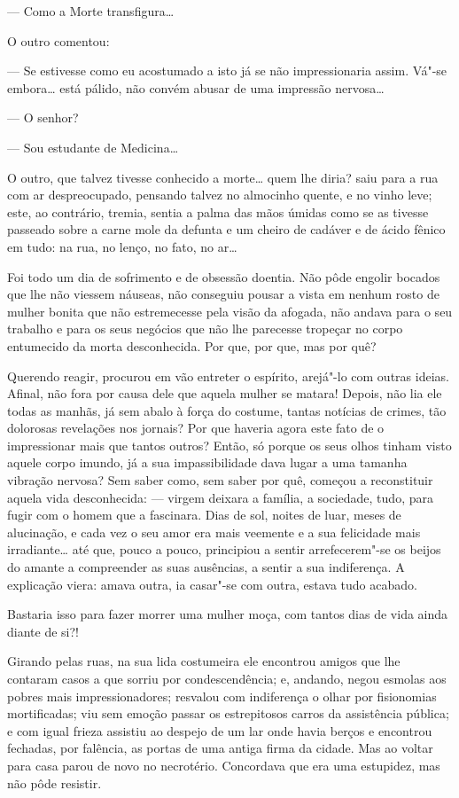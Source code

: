 --- Como a Morte transfigura\ldots{}

O outro comentou:

--- Se estivesse como eu acostumado a isto já se não impressionaria
assim. Vá"-se embora\ldots{} está pálido, não convém abusar de uma impressão
nervosa\ldots{}

--- O senhor?

--- Sou estudante de Medicina\ldots{}

O outro, que talvez tivesse conhecido a morte\ldots{} quem lhe diria? saiu
para a rua com ar despreocupado, pensando talvez no almocinho quente, e
no vinho leve; este, ao contrário, tremia, sentia a palma das mãos
úmidas como se as tivesse passeado sobre a carne mole da defunta e um
cheiro de cadáver e de ácido fênico em tudo: na rua, no lenço, no fato,
no ar\ldots{}

Foi todo um dia de sofrimento e de obsessão doentia. Não pôde engolir
bocados que lhe não viessem náuseas, não conseguiu pousar a vista em
nenhum rosto de mulher bonita que não estremecesse pela visão da
afogada, não andava para o seu trabalho e para os seus negócios que não
lhe parecesse tropeçar no corpo entumecido da morta desconhecida. Por
que, por que, mas por quê?

Querendo reagir, procurou em vão entreter o espírito, arejá"-lo com
outras ideias. Afinal, não fora por causa dele que aquela mulher se
matara! Depois, não lia ele todas as manhãs, já sem abalo à força do
costume, tantas notícias de crimes, tão dolorosas revelações nos
jornais? Por que haveria agora este fato de o impressionar mais que
tantos outros? Então, só porque os seus olhos tinham visto aquele corpo
imundo, já a sua impassibilidade dava lugar a uma tamanha vibração
nervosa? Sem saber como, sem saber por quê, começou a reconstituir
aquela vida desconhecida: --- virgem deixara a família, a sociedade,
tudo, para fugir com o homem que a fascinara. Dias de sol, noites de
luar, meses de alucinação, e cada vez o seu amor era mais veemente e a
sua felicidade mais irradiante\ldots{} até que, pouco a pouco, principiou a
sentir arrefecerem"-se os beijos do amante a compreender as suas
ausências, a sentir a sua indiferença. A explicação viera: amava outra,
ia casar"-se com outra, estava tudo acabado.

Bastaria isso para fazer morrer uma mulher moça, com tantos dias de vida
ainda diante de si?!

Girando pelas ruas, na sua lida costumeira ele encontrou amigos que lhe
contaram casos a que sorriu por condescendência; e, andando, negou
esmolas aos pobres mais impressionadores; resvalou com indiferença o
olhar por fisionomias mortificadas; viu sem emoção passar os
estrepitosos carros da assistência pública; e com igual frieza assistiu
ao despejo de um lar onde havia berços e encontrou fechadas, por
falência, as portas de uma antiga firma da cidade. Mas ao voltar para
casa parou de novo no necrotério. Concordava que era uma estupidez, mas
não pôde resistir.

